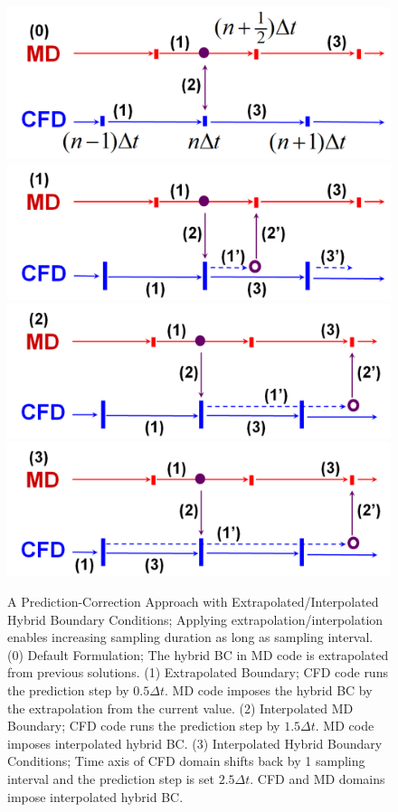 \documentclass[preprint,12pt]{elsarticle}
\begin{document}
\begin{figure}
\centering
\includegraphics[width=0.7\linewidth]{Prediction_Correction_Org.pdf}
\includegraphics[width=0.7\linewidth]{Prediction_Correction_Extra_Simple.pdf}
\includegraphics[width=0.7\linewidth]{Prediction_Correction_Inter_Simple.pdf}
\includegraphics[width=0.7\linewidth]{Prediction_Correction_Both_Simple.pdf}
\caption{\small A Prediction-Correction Approach with Extrapolated/Interpolated Hybrid Boundary Conditions; Applying extrapolation/interpolation enables increasing sampling duration as long as sampling interval. (0) Default Formulation; 
The hybrid BC in MD code is extrapolated from previous solutions.
(1) Extrapolated Boundary; CFD code runs the prediction step by $0.5{\Delta}t$. MD code imposes the hybrid BC by the extrapolation from the current value. (2) Interpolated MD Boundary; CFD code runs the prediction step by $1.5{\Delta}t$. MD code imposes interpolated hybrid BC. (3) Interpolated Hybrid Boundary Conditions; Time axis of CFD domain shifts back by 1 sampling interval and the prediction step is set $2.5{\Delta}t$. CFD and MD domains impose interpolated hybrid BC.}
\label{Hybrid_Timescale2}
\end{figure}
\end{document}
